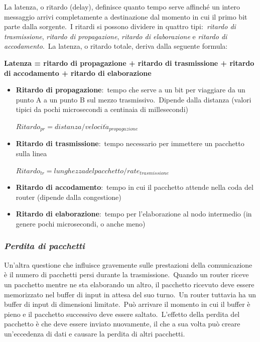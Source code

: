 La latenza, o ritardo (delay), definisce quanto tempo serve affinché un intero messaggio arrivi completamente a destinazione dal momento in cui il primo bit parte dalla sorgente.\
I ritardi si possono dividere in quattro tipi:\ \emph{ritardo di trasmissione}, \emph{ritardo di propagazione}, \emph{ritardo di elaborazione} e \emph{ritardo di accodamento}.\
La latenza, o ritardo totale, deriva dalla seguente formula:\
\begin{center}
    \textbf{Latenza = ritardo di propagazione + ritardo di trasmissione + ritardo di accodamento + ritardo di elaborazione}
\end{center}
\begin{itemize}
    \item \textbf{Ritardo di propagazione}:\ tempo che serve a un bit per viaggiare da un punto A a un punto B sul mezzo trasmissivo.\ Dipende dalla distanza (valori tipici da pochi microsecondi a centinaia di millesecondi)
          \begin{center}
              $Ritardo_{pr} = distanza/velocit\grave{a}_{propagazione}$
          \end{center}
    \item \textbf{Ritardo di trasmissione}:\ tempo necessario per immettere un pacchetto sulla linea
          \begin{center}
              $Ritardo_{tr} = lunghezza del pacchetto/rate_{trasmissione}$
          \end{center}
    \item \textbf{Ritardo di accodamento}:\ tempo in cui il pacchetto attende nella coda del router (dipende dalla congestione)
    \item \textbf{Ritardo di elaborazione}:\ tempo per l'elaborazione al nodo intermedio (in genere pochi microsecondi, o anche meno)
\end{itemize}

\subsubsection{\emph{Perdita di pacchetti}}

Un'altra questione che influisce gravemente sulle prestazioni della comunicazione è il numero di pacchetti persi durante la trasmissione.\
Quando un router riceve un pacchetto mentre ne sta elaborando un altro, il pacchetto ricevuto deve essere memorizzato nel buffer di input in attesa del suo turno.\
Un router tuttavia ha un buffer di input di dimensioni limitate.\
Può arrivare il momento in cui il buffer è pieno e il pacchetto successivo deve essere saltato.\
L'effetto della perdita del pacchetto è che deve essere inviato nuovamente, il che a sua volta può creare un'eccedenza di dati e causare la perdita di altri pacchetti.

